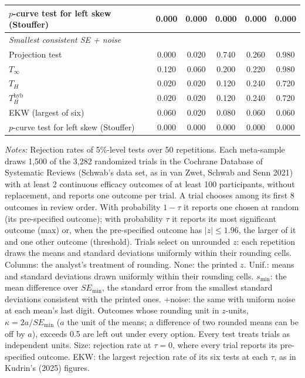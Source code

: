 \begin{table}[htbp]
\begin{tabular}{lccccc}
$p$-curve test for left skew (Stouffer) & 0.000 & 0.000 & 0.000 & 0.000 & 0.000 \\
\midrule
\multicolumn{6}{l}{\textit{Smallest consistent SE + noise}} \\
Projection test & 0.000 & 0.020 & 0.740 & 0.260 & 0.980 \\
$T_\infty$ & 0.120 & 0.060 & 0.200 & 0.220 & 0.980 \\
$T_H$ & 0.020 & 0.020 & 0.120 & 0.240 & 0.720 \\
$T_H^{\mathrm{hyb}}$ & 0.020 & 0.020 & 0.120 & 0.240 & 0.720 \\
EKW (largest of six) & 0.060 & 0.020 & 0.080 & 0.060 & 0.060 \\
$p$-curve test for left skew (Stouffer) & 0.000 & 0.000 & 0.000 & 0.000 & 0.000 \\
\bottomrule
\end{tabular}
\par\smallskip
\begin{minipage}{\linewidth}\footnotesize\textit{Notes:} Rejection rates of 5\%-level tests over 50 repetitions. Each meta-sample draws 1{,}500 of the 3{,}282 randomized trials in the Cochrane Database of Systematic Reviews (Schwab's data set, as in van Zwet, Schwab and Senn 2021) with at least 2 continuous efficacy outcomes of at least 100 participants, without replacement, and reports one outcome per trial. A trial chooses among its first 8 outcomes in review order. With probability $1 - \tau$ it reports one chosen at random (its pre-specified outcome); with probability $\tau$ it reports its most significant outcome (max) or, when the pre-specified outcome has $|z| \le 1.96$, the larger of it and one other outcome (threshold). Trials select on unrounded $z$: each repetition draws the means and standard deviations uniformly within their rounding cells. Columns: the analyst's treatment of rounding. None: the printed $z$. Unif.: means and standard deviations drawn uniformly within their rounding cells. $s_{\min}$: the mean difference over $SE_{\min}$, the standard error from the smallest standard deviations consistent with the printed ones. $+$noise: the same with uniform noise at each mean's last digit. Outcomes whose rounding unit in $z$-units, $\kappa = 2a/SE_{\min}$ ($a$ the unit of the means; a difference of two rounded means can be off by $a$), exceeds 0.5 are left out under every option. Every test treats trials as independent units. Size: rejection rate at $\tau = 0$, where every trial reports its pre-specified outcome. EKW: the largest rejection rate of its six tests at each $\tau$, as in Kudrin's (2025) figures.\end{minipage}
\end{table}
